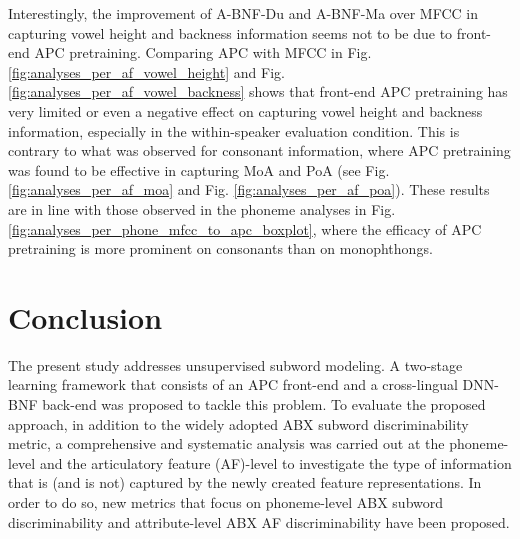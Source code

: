 \documentclass[transmag]{IEEEtran}
\begin{document}
Interestingly, the improvement of A-BNF-Du and A-BNF-Ma over MFCC in capturing vowel height and backness information seems not to be due to front-end APC pretraining.  Comparing APC with MFCC in Fig. \ref{fig:analyses_per_af_vowel_height} and Fig. \ref{fig:analyses_per_af_vowel_backness} shows that front-end APC pretraining has very limited or even a negative effect on capturing vowel height and backness information, especially in the within-speaker evaluation condition. This is contrary to what was observed for consonant information, where APC pretraining was found to be effective in capturing MoA and PoA (see Fig. \ref{fig:analyses_per_af_moa} and Fig. \ref{fig:analyses_per_af_poa}). These results are in line with those observed in the  phoneme analyses in Fig. \ref{fig:analyses_per_phone_mfcc_to_apc_boxplot}, where the efficacy of APC pretraining is more prominent on consonants than on monophthongs. 






\section{Conclusion}
\label{sec:conclusion}
The present study addresses unsupervised subword modeling. A two-stage learning framework that consists of an APC front-end and a cross-lingual DNN-BNF back-end was proposed to tackle this problem. To evaluate the proposed approach, in addition to the widely adopted ABX subword discriminability metric, a comprehensive and systematic analysis was carried out at the phoneme-level and the articulatory feature (AF)-level to investigate the type of information that is (and is not) captured by the newly created feature representations. In order to do so, new metrics that focus on phoneme-level ABX subword discriminability and attribute-level ABX AF discriminability have been proposed.
\end{document}
